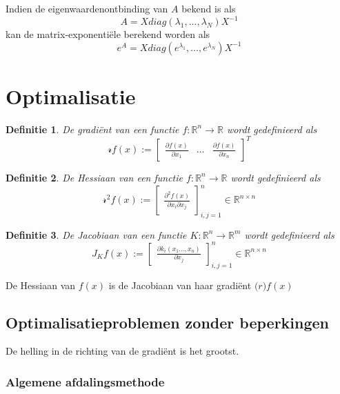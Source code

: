 \documentclass{article}
\newtheorem{mydef}{Definitie}
\begin{document}
	Indien de eigenwaardenontbinding van $A$ bekend is als
	$$
	 A = X diag(\lambda_1, ... , \lambda_N) X^{-1}
	$$
	kan de matrix-exponentiële berekend worden als
	$$
		e^A = X diag(e^{\lambda_1}, ... , e^{\lambda_N}) X^{-1}
	$$
	
	\section{Optimalisatie}
	
		\begin{mydef}
		De gradiënt van een functie $f: \mathbb{R}^n \to \mathbb{R}$ wordt gedefinieerd als
		$$
		\mathcal{r} f(x) :=
		\begin{bmatrix}
		\frac{\partial f(x)}{\partial x_1} & ... & \frac{\partial f(x)}{\partial x_n}
		\end{bmatrix}^T
		$$
	\end{mydef}
	
	\begin{mydef}
		De Hessiaan van een functie $f: \mathbb{R}^n \to \mathbb{R}$ wordt gedefinieerd als
		$$
		\mathcal{r}^2 f(x) :=
		\begin{bmatrix}
		\frac{\partial^2 f(x)}{\partial x_i \partial x_j}
		\end{bmatrix}_{i,j=1}^n
		\in \mathbb{R}^{n\times n}
		$$
	\end{mydef}
	
	\begin{mydef}
		De Jacobiaan van een functie $K: \mathbb{R}^n \to \mathbb{R}^m$ wordt gedefinieerd als
		$$
		J_Kf(x) :=
		\begin{bmatrix}
		\frac{\partial k_i (x_1 ..., x_n)}{\partial x_j}
		\end{bmatrix}_{i,j=1}^n
		\in \mathbb{R}^{n\times n}
		$$
	\end{mydef}
	
	De Hessiaan van $f(x)$ is de Jacobiaan van haar gradiënt $\mathcal(r) f(x)$
	
	\subsection{Optimalisatieproblemen zonder beperkingen}
	
	De helling in de richting van de gradiënt is het grootst.
	
	\subsubsection{Algemene afdalingsmethode}
	
\end{document}
